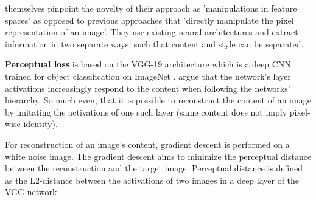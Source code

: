 \citeauthor*{gatys} themselves pinpoint the novelty of their approach as 'manipulations in feature spaces' as opposed to previous approaches that 'directly manipulate the pixel representation of an image'\cite{gatys}.
They use existing neural architectures and extract information in two separate ways, such that content and style can be separated.


\textbf{Perceptual loss} is based on the VGG-19 architecture \cite{VGG} which is a deep CNN trained for object classification on ImageNet \cite{imagenet}.
\citeauthor*{gatys} argue that the network's layer activations increasingly respond to the content when following the networks' hierarchy.
So much even, that it is possible to reconstruct the content of an image by imitating the activations of one such layer (same content does not imply pixel-wise identity).

For reconstruction of an image's content, gradient descent is performed on a white noise image.
The gradient descent aims to minimize the perceptual distance between the reconstruction and the target image.
Perceptual distance is defined as the L2-distance between the activations of two images in a deep layer of the VGG-network.

